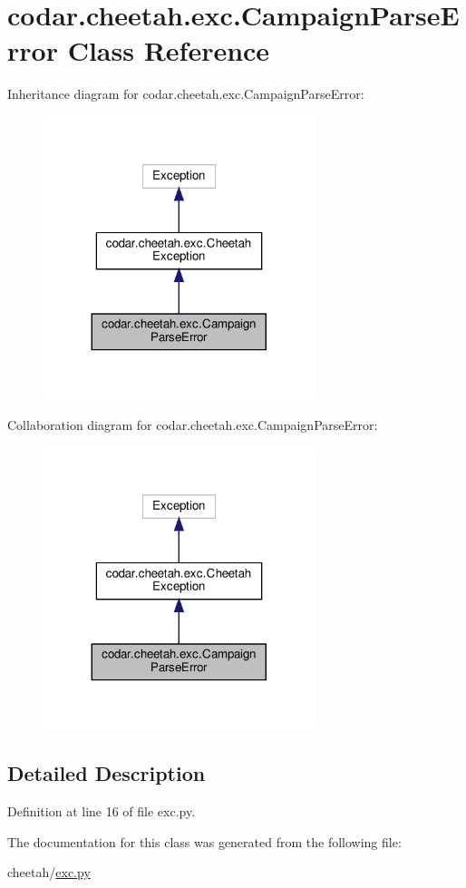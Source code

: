 \hypertarget{classcodar_1_1cheetah_1_1exc_1_1_campaign_parse_error}{}\section{codar.\+cheetah.\+exc.\+Campaign\+Parse\+Error Class Reference}
\label{classcodar_1_1cheetah_1_1exc_1_1_campaign_parse_error}


Inheritance diagram for codar.\+cheetah.\+exc.\+Campaign\+Parse\+Error\+:
\nopagebreak
\begin{figure}[H]
\begin{center}
\leavevmode
\includegraphics[width=224pt]{classcodar_1_1cheetah_1_1exc_1_1_campaign_parse_error__inherit__graph}
\end{center}
\end{figure}


Collaboration diagram for codar.\+cheetah.\+exc.\+Campaign\+Parse\+Error\+:
\nopagebreak
\begin{figure}[H]
\begin{center}
\leavevmode
\includegraphics[width=224pt]{classcodar_1_1cheetah_1_1exc_1_1_campaign_parse_error__coll__graph}
\end{center}
\end{figure}


\subsection{Detailed Description}


Definition at line 16 of file exc.\+py.



The documentation for this class was generated from the following file\+:\begin{DoxyCompactItemize}
\item 
cheetah/\hyperlink{cheetah_2exc_8py}{exc.\+py}\end{DoxyCompactItemize}
